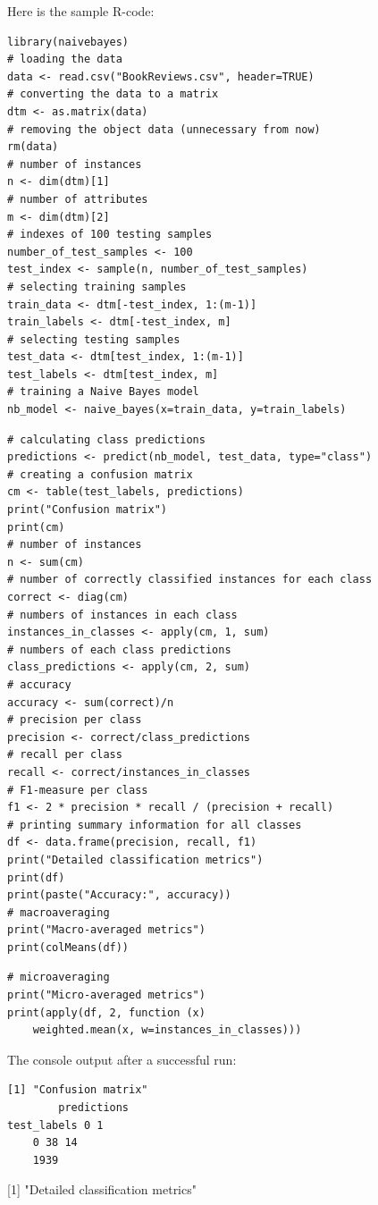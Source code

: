 \documentclass[10pt]{book}
\begin{document}
Here is the sample R-code:

\begin{verbatim}
library(naivebayes)
# loading the data
data <- read.csv("BookReviews.csv", header=TRUE)
# converting the data to a matrix
dtm <- as.matrix(data)
# removing the object data (unnecessary from now)
rm(data)
# number of instances
n <- dim(dtm)[1]
# number of attributes
m <- dim(dtm)[2]
# indexes of 100 testing samples
number_of_test_samples <- 100
test_index <- sample(n, number_of_test_samples)
# selecting training samples
train_data <- dtm[-test_index, 1:(m-1)]
train_labels <- dtm[-test_index, m]
# selecting testing samples
test_data <- dtm[test_index, 1:(m-1)]
test_labels <- dtm[test_index, m]
# training a Naive Bayes model
nb_model <- naive_bayes(x=train_data, y=train_labels)
\end{verbatim}

\begin{verbatim}
# calculating class predictions
predictions <- predict(nb_model, test_data, type="class")
# creating a confusion matrix
cm <- table(test_labels, predictions)
print("Confusion matrix")
print(cm)
# number of instances
n <- sum(cm)
# number of correctly classified instances for each class
correct <- diag(cm)
# numbers of instances in each class
instances_in_classes <- apply(cm, 1, sum)
# numbers of each class predictions
class_predictions <- apply(cm, 2, sum)
# accuracy
accuracy <- sum(correct)/n
# precision per class
precision <- correct/class_predictions
# recall per class
recall <- correct/instances_in_classes
# F1-measure per class
f1 <- 2 * precision * recall / (precision + recall)
# printing summary information for all classes
df <- data.frame(precision, recall, f1)
print("Detailed classification metrics")
print(df)
print(paste("Accuracy:", accuracy))
# macroaveraging
print("Macro-averaged metrics")
print(colMeans(df))
\end{verbatim}

\begin{verbatim}
# microaveraging
print("Micro-averaged metrics")
print(apply(df, 2, function (x)
    weighted.mean(x, w=instances_in_classes)))
\end{verbatim}

The console output after a successful run:

\begin{verbatim}
[1] "Confusion matrix"
        predictions
test_labels 0 1
    0 38 14
    1939
\end{verbatim}

[1] "Detailed classification metrics"
\end{document}
